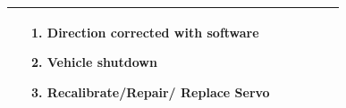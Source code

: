 \documentclass [10pt]{article}
\begin{document}
{\begin{minipage}{\textwidth}
\begin{longtable}{ |p{ }  | p{ } |  p{ } |  p{ } | p{ } | p{ } |  p{ }|}
    
    & \cellcolor{tableCell}\begin{minipage}{.24 \columnwidth} 
                \vspace{2mm}
                \begin{enumerate}
                    \item Direction corrected with software
                    \item Vehicle shutdown 
                    \item Recalibrate/Repair/ Replace Servo \vspace {1mm}
                \end{enumerate}
        \end{minipage} \\ \hline
    
   
    
    
    

\end{longtable}
\end{minipage}}
\end{document}

